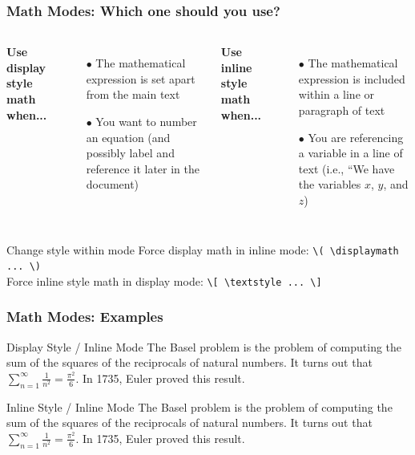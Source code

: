 \begin{frame}[fragile]
\frametitle{Math Modes: Which one should you use?}
\begin{columns}
    \textbf{Use display style math when...}
    \begin{itemize}
        \item[$\bullet$] The mathematical expression is set apart from the main text
        \item[$\bullet$] You want to number an equation (and possibly label and reference it later in the document)
    \end{itemize}
    \textbf{Use inline style math when...}
    \begin{itemize}
        \item[$\bullet$] The mathematical expression is included within a line or paragraph of text
        \item[$\bullet$] You are referencing a variable in a line of text (i.e., ``We have the variables $x$, $y$, and $z$)
    \end{itemize}
\end{columns}
\begin{block}{Change style within mode}
Force display math in inline mode: \verb|\( \displaymath ... \)| \\
Force inline style math in display mode: \verb|\[ \textstyle ... \]| \\
\end{block}
\end{frame}


\begin{frame}[fragile]
\frametitle{Math Modes: Examples}
\begin{exampleblock}{Display Style / Inline Mode}
    \small The Basel problem is the problem of computing the sum of the squares of the reciprocals of natural numbers. It turns out that \( \displaystyle \sum^\infty_{n=1} \frac{1}{n^2} = \frac{\pi^2}{6}\). In 1735, Euler proved this result.
\end{exampleblock}
\begin{exampleblock}{Inline Style / Inline Mode}
    \small The Basel problem is the problem of computing the sum of the squares of the reciprocals of natural numbers. It turns out that \( \sum^\infty_{n=1} \frac{1}{n^2} = \frac{\pi^2}{6}\). In 1735, Euler proved this result.
\end{exampleblock}
\end{frame}

